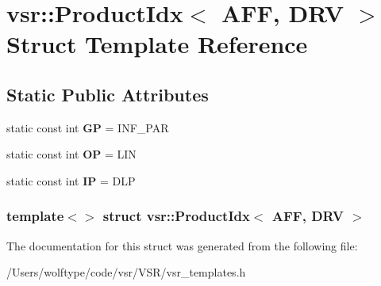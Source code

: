 \hypertarget{structvsr_1_1_product_idx_3_01_a_f_f_00_01_d_r_v_01_4}{\section{vsr\-:\-:Product\-Idx$<$ A\-F\-F, D\-R\-V $>$ Struct Template Reference}
\label{structvsr_1_1_product_idx_3_01_a_f_f_00_01_d_r_v_01_4}
}
\subsection*{Static Public Attributes}
\begin{DoxyCompactItemize}
\item 
\hypertarget{structvsr_1_1_product_idx_3_01_a_f_f_00_01_d_r_v_01_4_add109e4ae9d2210fe1622c98e8a41828}{static const int {\bfseries G\-P} = I\-N\-F\-\_\-\-P\-A\-R}\label{structvsr_1_1_product_idx_3_01_a_f_f_00_01_d_r_v_01_4_add109e4ae9d2210fe1622c98e8a41828}

\item 
\hypertarget{structvsr_1_1_product_idx_3_01_a_f_f_00_01_d_r_v_01_4_afe19e0aaedeae9da8f9beda3405dead9}{static const int {\bfseries O\-P} = L\-I\-N}\label{structvsr_1_1_product_idx_3_01_a_f_f_00_01_d_r_v_01_4_afe19e0aaedeae9da8f9beda3405dead9}

\item 
\hypertarget{structvsr_1_1_product_idx_3_01_a_f_f_00_01_d_r_v_01_4_a711e894e16e6e799f722416da66bf3ea}{static const int {\bfseries I\-P} = D\-L\-P}\label{structvsr_1_1_product_idx_3_01_a_f_f_00_01_d_r_v_01_4_a711e894e16e6e799f722416da66bf3ea}

\end{DoxyCompactItemize}
\subsubsection*{template$<$$>$ struct vsr\-::\-Product\-Idx$<$ A\-F\-F, D\-R\-V $>$}



The documentation for this struct was generated from the following file\-:\begin{DoxyCompactItemize}
\item 
/\-Users/wolftype/code/vsr/\-V\-S\-R/vsr\-\_\-templates.\-h\end{DoxyCompactItemize}
